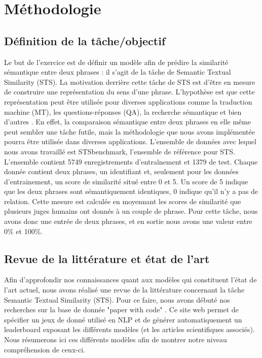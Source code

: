 \documentclass[11pt,a4paper, french]{article}
\begin{document}
%

\section{Méthodologie}


\subsection{Définition de la tâche/objectif}
Le but de l’exercice est de définir un modèle afin de prédire la similarité sémantique entre deux phrases : il s'agit de la tâche de Semantic Textual Similarity (STS). La motivation derrière cette tâche de STS est d’être en mesure de construire une représentation du sens d’une phrase. L’hypothèse est que cette représentation peut être utilisée pour diverses applications comme la traduction machine (MT), les questions-réponses (QA), la recherche sémantique et bien d’autres \cite{Cer_2017}. En effet, la comparaison sémantique entre deux phrases en elle même peut sembler une tâche futile, mais la méthodologie que nous avons implémentée pourra être utilisée dans diverses applications.
	L’ensemble de données avec lequel nous avons travaillé est STSbenchmark, l’ensemble de référence pour STS. L’ensemble contient 5749 enregistrements d'entraînement et 1379 de test. Chaque donnée contient deux phrases, un identifiant et, seulement pour les données d'entrainement, un score de similarité situé entre 0 et 5. Un score de 5 indique que les deux phrases sont sémantiquement identiques, 0 indique qu’il n’y a pas de relation. Cette mesure est calculée en moyennant les scores de similarité que plusieurs juges humains ont donnés à un couple de phrase. Pour cette tâche, nous avons donc une entrée de deux phrases, et en sortie nous avons une valeur entre 0\% et 100\%.

\subsection{Revue de la littérature et état de l'art}
Afin d'approfondir nos connaissances quant aux modèles qui constituent l'état de l'art actuel, nous avons réalisé une revue de la littérature concernant la tâche Semantic Textual Similarity (STS). Pour ce faire, nous avons débuté nos recherches sur la base de donnée "paper with code" \cite{sota}. Ce site web permet de spécifier un jeux de donné utilisé en NLP et de générer automatiquement un leaderboard exposant les différents modèles (et les articles scientifiques associés). Nous résumerons ici ces différents modèles afin de montrer notre niveau compréhension de ceux-ci. 
\end{document}

